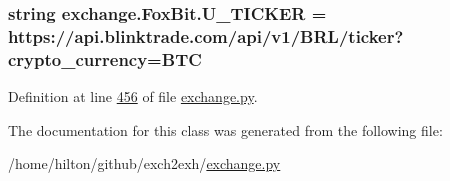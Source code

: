 \subsubsection[{\texorpdfstring{U\+\_\+\+T\+I\+C\+K\+ER}{U_TICKER}}]{\setlength{\rightskip}{0pt plus 5cm}string exchange.\+Fox\+Bit.\+U\+\_\+\+T\+I\+C\+K\+ER = \textquotesingle{}https\+://api.\+blinktrade.\+com/api/v1/B\+RL/{\bf ticker}?crypto\+\_\+currency=B\+TC\textquotesingle{}\hspace{0.3cm}{\ttfamily [static]}}\hypertarget{classexchange_1_1_fox_bit_a7ba3f64a2b55479da2239393c6140ec8}{}\label{classexchange_1_1_fox_bit_a7ba3f64a2b55479da2239393c6140ec8}


Definition at line \hyperlink{exchange_8py_source_l00456}{456} of file \hyperlink{exchange_8py_source}{exchange.\+py}.



The documentation for this class was generated from the following file\+:\begin{DoxyCompactItemize}
\item 
/home/hilton/github/exch2exh/\hyperlink{exchange_8py}{exchange.\+py}\end{DoxyCompactItemize}
